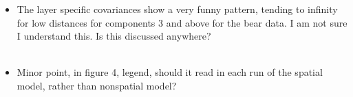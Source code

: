 \documentclass[11pt]{letter}
\newcommand{\gb}[1]{{\bf\color{black}{#1}}}
\begin{document}
\begin{itemize}
\item The layer specific covariances show a very funny pattern, tending to infinity for low distances for components 3 and above for the bear data. I am not sure I understand this. Is this discussed anywhere?\\\\
\gb{I think what's happening is that these layer-specific covariances for layers $>$2 
are describing local departures from global patterns of IBD, 
as might be expected due to, e.g., inbreeding.
We have added some text to that effect in lines XXX-XXX.}

\item Minor point, in figure 4, legend, should it read in each run of the spatial model, rather than nonspatial model?\\\\
\gb{Good catch!  Caption has been fixed.}
\end{itemize}
\end{document}
